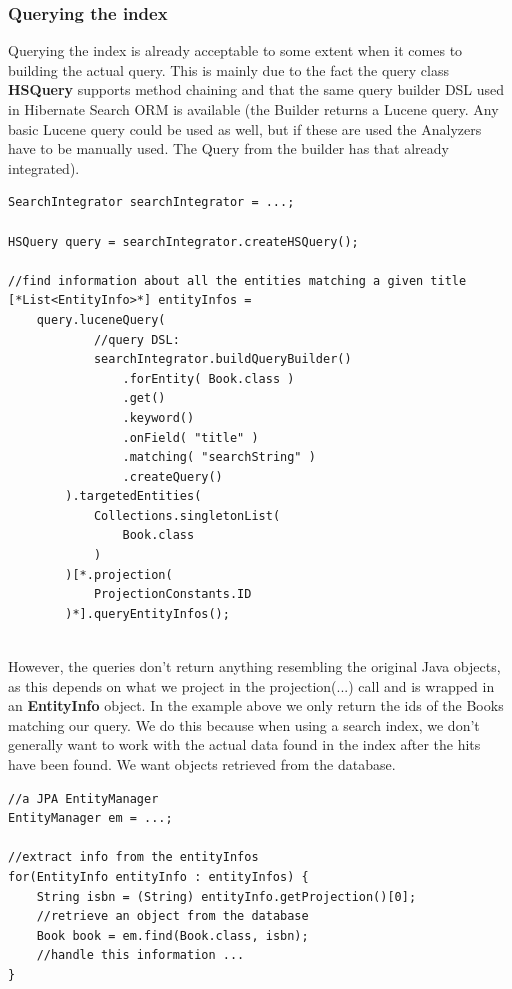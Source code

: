 \subsubsection{Querying the index}
Querying the index is already acceptable to some extent when it comes to building the actual query. This is mainly due to the fact the query class \textbf{HSQuery} supports method chaining and that the same query builder DSL used in Hibernate Search ORM is available (the Builder returns a Lucene query. Any basic Lucene query could be used as well, but if these are used the Analyzers have to be manually used. The Query from the builder has that already integrated).
\\
\lstset{language=java}
\begin{lstlisting}[frame=htrbl, caption={Querying the index with the engine}, label={lst:querying_natively.java}]
SearchIntegrator searchIntegrator = ...;

HSQuery query = searchIntegrator.createHSQuery();

//find information about all the entities matching a given title
[*List<EntityInfo>*] entityInfos = 
	query.luceneQuery(
			//query DSL:
			searchIntegrator.buildQueryBuilder()
				.forEntity( Book.class )
				.get()
				.keyword()
				.onField( "title" )
				.matching( "searchString" )
				.createQuery()
		).targetedEntities(
			Collections.singletonList(
				Book.class
			)
		)[*.projection(
			ProjectionConstants.ID
		)*].queryEntityInfos();
\end{lstlisting}
~\\
However, the queries don't return anything resembling the original Java objects, as this depends on what we project in the projection(...) call and is wrapped in an \textbf{EntityInfo} object. In the example above we only return the ids of the Books matching our query. We do this because when using a search index, we don't generally want to work with the actual data found in the index after the hits have been found. We want objects retrieved from the database.
\\
\lstset{language=java}
\begin{lstlisting}[frame=htrbl, caption={Extracting info from the results}, label={lst:querying_natively.java_2}]
//a JPA EntityManager
EntityManager em = ...;

//extract info from the entityInfos
for(EntityInfo entityInfo : entityInfos) {
	String isbn = (String) entityInfo.getProjection()[0];
	//retrieve an object from the database
	Book book = em.find(Book.class, isbn);
	//handle this information ...
}
\end{lstlisting}


